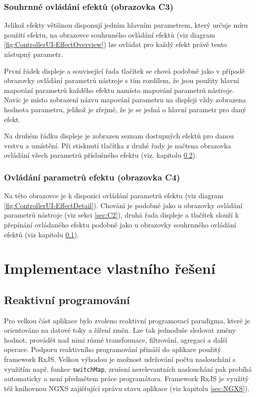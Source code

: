 \documentclass[thesis=M,czech]{FITthesis}[2019/03/06]
\begin{document}
		\subsection{Souhrnné ovládání efektů (obrazovka C3)}\label{sec:C3}
			Jelikož efekty většinou disponují jedním hlavním parametrem, který určuje míru použití efektu,
			na obrazovce souhrnného ovládání efektů (viz diagram \ref{fig:ControllerUI-EffectOverview}) lze ovládat pro každý
			efekt právě tento zástupný parametr.
			
			První řádek displeje a související řada tlačítek se chová podobně jako v případě obrazovky ovládání parametrů nástroje
			s tím rozdílem, že jsou použity hlavní mapování parametrů každého efektu namísto mapování parametrů nástroje.
			Navíc je místo zobrazení názvu mapování parametru na displeji vždy zobrazena hodnota parametru, jelikož je zřejmé,
			že je se jedná o hlavní parametr pro daný efekt.
			
			Na druhém řádku displeje je zobrazen seznam dostupných efektů pro danou vrstvu a umístění. Při stisknutí tlačítka
			z druhé řady je načtena obrazovka ovládání všech parametrů příslušného efektu (viz. kapitolu \ref{sec:C4}).
		
		\subsection{Ovládání parametrů efektu (obrazovka C4)}\label{sec:C4}
			Na této obrazovce je k dispozici ovládání parametrů efektu (viz diagram \ref{fig:ControllerUI-EffectDetail}).
			Chování je podobné jako u obrazovky ovládání parametrů nástroje (viz sekci \ref{sec:C2}), druhá řada displeje a tlačítek
			slouží k přepínání ovládaného efektu podobně jako u obrazovky souhrnného ovládání efektů (viz kapitolu \ref{sec:C3}).
		
\chapter{Implementace vlastního řešení}
	\section{Reaktivní programování}
		Pro velkou část aplikace bylo zvoleno reaktivní programovací paradigma, které je orientováno
		na datové toky a šíření změn. Lze tak jednoduše sledovat změny hodnot, provádět 
		nad nimi různé transformace, filtrování, agregaci a další operace. Podporu reaktivního programování přináší do aplikace
		použitý framework RxJS\cite{clow2018observers}. Velkou výhodou je možnost udržování počtu naslouchání
		s využitím např. funkce \texttt{switchMap}, zrušení nerelevantních naslouchání pak probíhá automaticky a není předmětem práce programátora.
		Framework RxJS je využitý též knihovnou NGXS zajišťující správu stavu aplikace (viz kapitolu \ref{sec:NGXS}).
\end{document}

